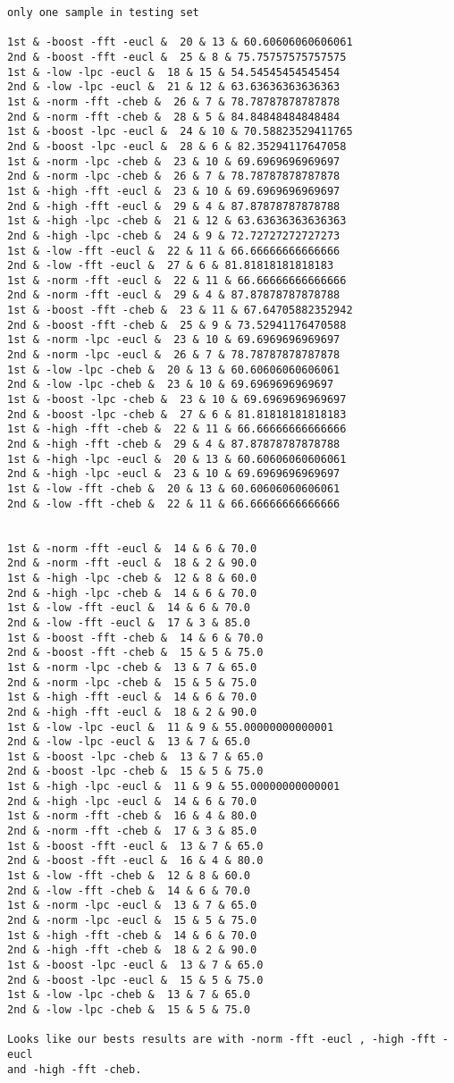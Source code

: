 \begin{verbatim}
only one sample in testing set

1st & -boost -fft -eucl &  20 & 13 & 60.60606060606061
2nd & -boost -fft -eucl &  25 & 8 & 75.75757575757575
1st & -low -lpc -eucl &  18 & 15 & 54.54545454545454
2nd & -low -lpc -eucl &  21 & 12 & 63.63636363636363
1st & -norm -fft -cheb &  26 & 7 & 78.78787878787878
2nd & -norm -fft -cheb &  28 & 5 & 84.84848484848484
1st & -boost -lpc -eucl &  24 & 10 & 70.58823529411765
2nd & -boost -lpc -eucl &  28 & 6 & 82.35294117647058
1st & -norm -lpc -cheb &  23 & 10 & 69.6969696969697
2nd & -norm -lpc -cheb &  26 & 7 & 78.78787878787878
1st & -high -fft -eucl &  23 & 10 & 69.6969696969697
2nd & -high -fft -eucl &  29 & 4 & 87.87878787878788
1st & -high -lpc -cheb &  21 & 12 & 63.63636363636363
2nd & -high -lpc -cheb &  24 & 9 & 72.72727272727273
1st & -low -fft -eucl &  22 & 11 & 66.66666666666666
2nd & -low -fft -eucl &  27 & 6 & 81.81818181818183
1st & -norm -fft -eucl &  22 & 11 & 66.66666666666666
2nd & -norm -fft -eucl &  29 & 4 & 87.87878787878788
1st & -boost -fft -cheb &  23 & 11 & 67.64705882352942
2nd & -boost -fft -cheb &  25 & 9 & 73.52941176470588
1st & -norm -lpc -eucl &  23 & 10 & 69.6969696969697
2nd & -norm -lpc -eucl &  26 & 7 & 78.78787878787878
1st & -low -lpc -cheb &  20 & 13 & 60.60606060606061
2nd & -low -lpc -cheb &  23 & 10 & 69.6969696969697
1st & -boost -lpc -cheb &  23 & 10 & 69.6969696969697
2nd & -boost -lpc -cheb &  27 & 6 & 81.81818181818183
1st & -high -fft -cheb &  22 & 11 & 66.66666666666666
2nd & -high -fft -cheb &  29 & 4 & 87.87878787878788
1st & -high -lpc -eucl &  20 & 13 & 60.60606060606061
2nd & -high -lpc -eucl &  23 & 10 & 69.6969696969697
1st & -low -fft -cheb &  20 & 13 & 60.60606060606061
2nd & -low -fft -cheb &  22 & 11 & 66.66666666666666


1st & -norm -fft -eucl &  14 & 6 & 70.0
2nd & -norm -fft -eucl &  18 & 2 & 90.0
1st & -high -lpc -cheb &  12 & 8 & 60.0
2nd & -high -lpc -cheb &  14 & 6 & 70.0
1st & -low -fft -eucl &  14 & 6 & 70.0
2nd & -low -fft -eucl &  17 & 3 & 85.0
1st & -boost -fft -cheb &  14 & 6 & 70.0
2nd & -boost -fft -cheb &  15 & 5 & 75.0
1st & -norm -lpc -cheb &  13 & 7 & 65.0
2nd & -norm -lpc -cheb &  15 & 5 & 75.0
1st & -high -fft -eucl &  14 & 6 & 70.0
2nd & -high -fft -eucl &  18 & 2 & 90.0
1st & -low -lpc -eucl &  11 & 9 & 55.00000000000001
2nd & -low -lpc -eucl &  13 & 7 & 65.0
1st & -boost -lpc -cheb &  13 & 7 & 65.0
2nd & -boost -lpc -cheb &  15 & 5 & 75.0
1st & -high -lpc -eucl &  11 & 9 & 55.00000000000001
2nd & -high -lpc -eucl &  14 & 6 & 70.0
1st & -norm -fft -cheb &  16 & 4 & 80.0
2nd & -norm -fft -cheb &  17 & 3 & 85.0
1st & -boost -fft -eucl &  13 & 7 & 65.0
2nd & -boost -fft -eucl &  16 & 4 & 80.0
1st & -low -fft -cheb &  12 & 8 & 60.0
2nd & -low -fft -cheb &  14 & 6 & 70.0
1st & -norm -lpc -eucl &  13 & 7 & 65.0
2nd & -norm -lpc -eucl &  15 & 5 & 75.0
1st & -high -fft -cheb &  14 & 6 & 70.0
2nd & -high -fft -cheb &  18 & 2 & 90.0
1st & -boost -lpc -eucl &  13 & 7 & 65.0
2nd & -boost -lpc -eucl &  15 & 5 & 75.0
1st & -low -lpc -cheb &  13 & 7 & 65.0
2nd & -low -lpc -cheb &  15 & 5 & 75.0

Looks like our bests results are with -norm -fft -eucl , -high -fft -eucl
and -high -fft -cheb.

\end{verbatim}
